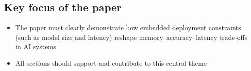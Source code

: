 \subsection{Key focus of the paper}
\begin{itemize}
  \item The paper must clearly demonstrate how embedded deployment constraints (such as model size and latency) reshape memory--accuracy--latency trade-offs in AI systems
  \item All sections should support and contribute to this central theme
\end{itemize}
